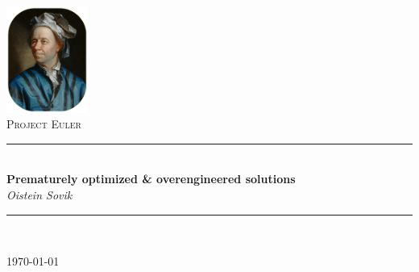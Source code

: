 \begin{titlepage}
\begin{center}
\includegraphics[width=0.20\textwidth]{../Images/portrait.png}~\\[1cm]

\textsc{\LARGE Project Euler}\\[1.5cm]


\rule{\linewidth}{0.5mm} \\[0.4cm]
{ \huge \bfseries Prematurely optimized \& overengineered solutions}\\[0.5cm]
{\large \textit{Oistein Sovik}}\\[0.2cm]
\rule{\linewidth}{0.5mm} \\[1.5cm]



\vfill

{\large \today}
\end{center}
\end{titlepage}

